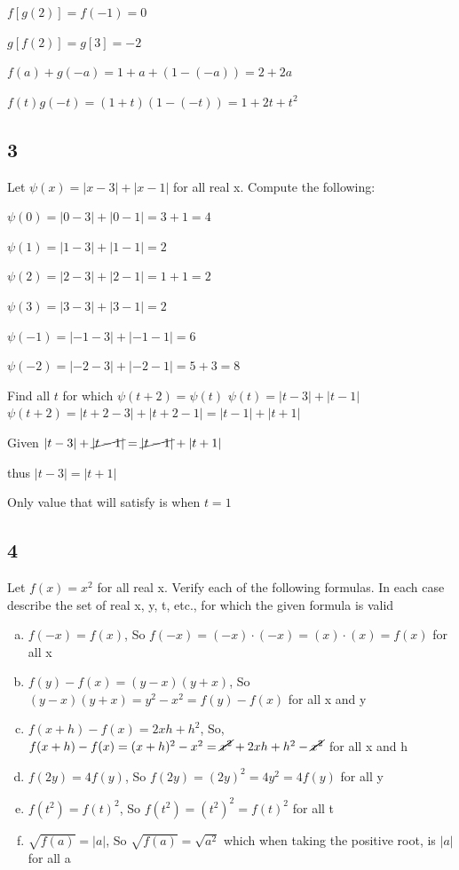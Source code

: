 \documentclass{report}
\begin{document}
$f[g(2)] = f(-1) = 0$

$g[f(2)] = g[3] = -2$

$f(a) + g(-a) = 1 + a + (1 - (-a)) = 2 + 2a$

$f(t)g(-t) = (1 + t)(1 - (-t)) = 1 + 2t + t^2$

\subsection{3}

Let $\psi(x) = |x - 3| + |x -1|$ for all real x. Compute the following:

$\psi(0) = |0 - 3| + |0 - 1| = 3 + 1 = 4$

$\psi(1) = |1 - 3| + |1 - 1| = 2$

$\psi(2) = |2 - 3| + |2 - 1| = 1 + 1 = 2$

$\psi(3) = |3 - 3| + |3 - 1| = 2$

$\psi(-1) = |-1 - 3| + |-1 - 1| = 6$

$\psi(-2) = |-2 - 3| + |-2 - 1| = 5 + 3 = 8$

Find all $t$ for which $\psi(t + 2) = \psi(t)$
$\psi(t) = |t - 3| + |t - 1|$
$\psi(t+2) = |t + 2 - 3| + |t + 2 - 1| = |t - 1| + |t + 1| $

Given $|t - 3| + \cancel{|t - 1|} = \cancel{|t - 1|} + |t + 1|$ 

thus $|t - 3| = |t + 1|$

Only value that will satisfy is when $t = 1$

\subsection{4}

Let $f(x) = x^2$ for all real x. Verify each of the following formulas. In each case describe the set of real x, y, t, etc., for which the given formula is valid

\begin{enumerate}[(a)]
	\item $f(-x) = f(x)$, So $	f(-x) =(-x)\cdot(-x) = (x) \cdot (x) = f(x)$ for all x
	\item $f(y) - f(x) = (y-x)(y+x)$, So $(y-x)(y+x) = y^2 - x^2 = f(y) - f(x)$ for all x and y
	\item $f(x+h) - f(x) = 2xh + h^2$, So, $f(x+h) - f(x) = (x+h)^2 - x^2 = \cancel{x^2} + 2xh + h^2 - \cancel{x^2}$ for all x and h
	\item $f(2y) = 4f(y)$, So $f(2y) = (2y)^2 = 4y^2 = 4f(y)$ for all y
	\item $f(t^2) = f(t)^2$, So $f(t^2) = (t^2)^2 = f(t)^2$ for all t
	\item $\sqrt{f(a)} = |a|$, So $\sqrt{f(a)} = \sqrt{a^2}$ which when taking the positive root, is $|a|$ for all a
\end{enumerate}
\end{document}
